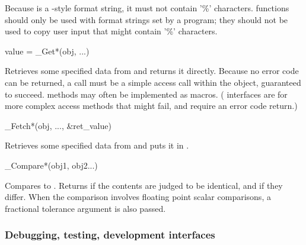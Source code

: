 \begin{sreapi}
Because  is a -style format string,
it must not contain '\%' characters.  functions
should only be used with format strings set by a program; they should
not be used to copy user input that might contain '\%' characters.

\hypertarget{ifc:Get}
{\item[value = \_Get*(obj, ...)]}

Retrieves some specified data from  and returns it
directly. Because no error code can be returned, a 
call must be a simple access call within the object, guaranteed to
succeed.  methods may often be implemented as macros.
( interfaces are for more complex access methods that
might fail, and require an error code return.)

\hypertarget{ifc:Fetch}
{\item[\_Fetch*(obj, ..., \&ret\_value)]}

Retrieves some specified data from  and puts it in
.

\hypertarget{ifc:Compare}
{\item[\_Compare*(obj1, obj2...)]}

Compares  to . Returns  if the
contents are judged to be identical, and  if they
differ. When the comparison involves floating point scalar
comparisons, a fractional tolerance argument  is also
passed. 

\end{sreapi}



\subsubsection{Debugging, testing, development interfaces}

